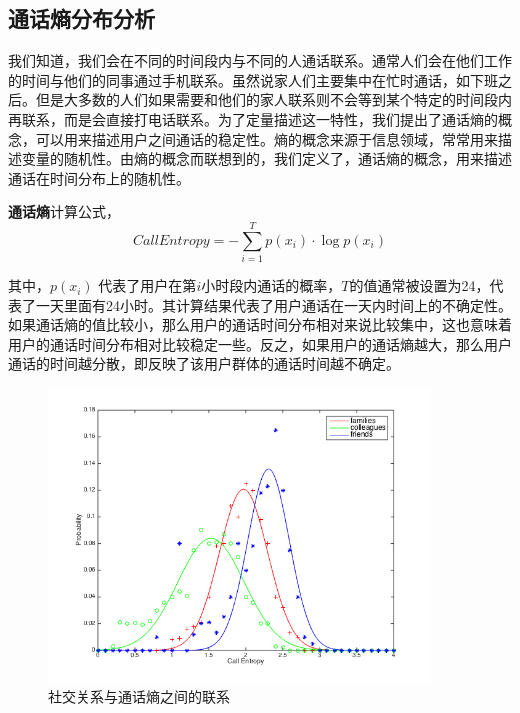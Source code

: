 \subsection{通话熵分布分析}

我们知道，我们会在不同的时间段内与不同的人通话联系。通常人们会在他们工作的时间与他们的同事通过手机联系。虽然说家人们主要集中在忙时通话，如下班之后。但是大多数的人们如果需要和他们的家人联系则不会等到某个特定的时间段内再联系，而是会直接打电话联系。为了定量描述这一特性，我们提出了通话熵的概念，可以用来描述用户之间通话的稳定性。熵的概念来源于信息领域，常常用来描述变量的随机性。由熵的概念而联想到的，我们定义了，通话熵的概念，用来描述通话在时间分布上的随机性。

\begin{definition}
    \label{call-entrpy-concept}
    \textbf{通话熵}计算公式，
    \begin{equation}
        CallEntropy = - \sum_{i=1}^{T}p(x_i)\cdot\log p(x_i)
    \end{equation}
\end{definition}


其中，$p(x_i)$ 代表了用户在第$i$小时段内通话的概率，$T$的值通常被设置为24，代表了一天里面有24小时。其计算结果代表了用户通话在一天内时间上的不确定性。如果通话熵的值比较小，那么用户的通话时间分布相对来说比较集中，这也意味着用户的通话时间分布相对比较稳定一些。反之，如果用户的通话熵越大，那么用户通话的时间越分散，即反映了该用户群体的通话时间越不确定。


\begin{figure}[!ht]
    \centering
    \includegraphics[scale=1,width=0.9\textwidth]{figure/CallEntropyDistribution.png}
    \caption{社交关系与通话熵之间的联系}
    \label{fig-call-entropy}
\end{figure}


